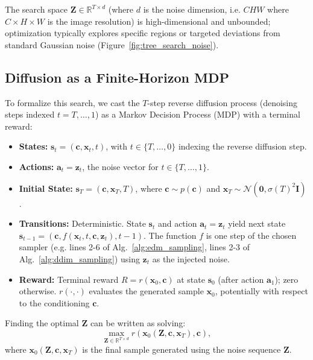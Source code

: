 \documentclass{article}
\newcommand{\calN}{\mathcal{N}} %
\newcommand{\matI}{\mathbf{I}}   %
\begin{document}
The search space $\mathbf{Z} \in \mathbb{R}^{T \times d}$ (where $d$ is the noise dimension, i.e. $CHW$ where $C \times H \times W$ is the image resolution) is high-dimensional and unbounded; optimization typically explores specific regions or targeted deviations from standard Gaussian noise (Figure~\ref{fig:tree_search_noise}).

\subsection{Diffusion as a Finite-Horizon MDP}

To formalize this search, we cast the $T$-step reverse diffusion process (denoising steps indexed $t = T, \dots, 1$) as a Markov Decision Process (MDP) with a terminal reward:

\begin{itemize}
    \item \textbf{States:} $\mathbf{s}_t = (\mathbf{c}, \mathbf{x}_t, t)$, with $t \in \{T, \dots, 0\}$ indexing the reverse diffusion step.
    \item \textbf{Actions:} $\mathbf{a}_t = \mathbf{z}_t$, the noise vector for $t \in \{T, \dots, 1\}$.
    \item \textbf{Initial State:} $\mathbf{s}_T = (\mathbf{c}, \mathbf{x}_T, T)$, where $\mathbf{c} \sim p(\mathbf{c})$ and $\mathbf{x}_T \sim \calN(\mathbf{0}, \sigma(T)^2\matI)$.
    \item \textbf{Transitions:} Deterministic. State $\mathbf{s}_t$ and action $\mathbf{a}_t=\mathbf{z}_t$ yield next state $\mathbf{s}_{t-1} = (\mathbf{c}, f(\mathbf{x}_t, t, \mathbf{c}, \mathbf{z}_t), t-1)$. The function $f$ is one step of the chosen sampler (e.g. lines 2-6 of Alg.~\ref{alg:edm_sampling}, lines  2-3 of Alg.~\ref{alg:ddim_sampling}) using $\mathbf{z}_t$ as the injected noise.
    \item \textbf{Reward:} Terminal reward $R=r(\mathbf{x}_0, \mathbf{c})$ at state $\mathbf{s}_0$ (after action $\mathbf{a}_1$); zero otherwise. $r(\cdot,\cdot)$ evaluates the generated sample $\mathbf{x}_0$, potentially with respect to the conditioning $\mathbf{c}$.
\end{itemize}

Finding the optimal $\mathbf{Z}$ can be written as solving:
\begin{equation}
    \max_{\mathbf{Z} \in \mathbb{R}^{T \times d}} r(\mathbf{x}_0(\mathbf{Z}, \mathbf{c}, \mathbf{x}_T), \mathbf{c}),
\label{eq:optimize_Z}
\end{equation}
where $\mathbf{x}_0(\mathbf{Z}, \mathbf{c}, \mathbf{x}_T)$ is the final sample generated using the noise sequence $\mathbf{Z}$.
\end{document}
